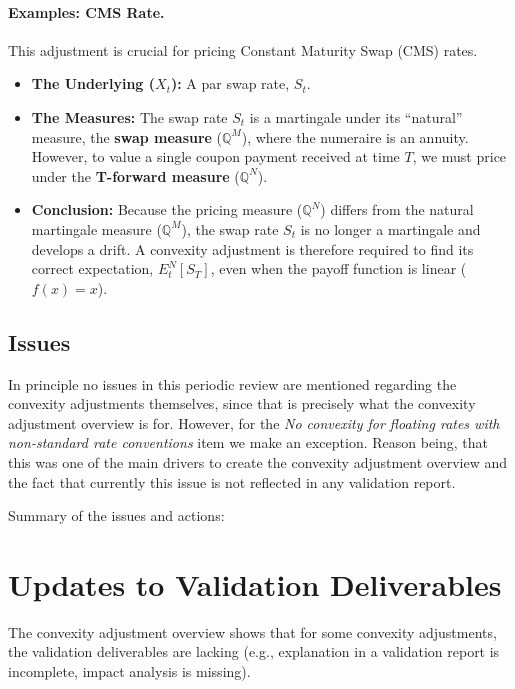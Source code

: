 \documentclass[reviewdoc]{pmv_report} %
\begin{document}
\paragraph*{Examples: CMS Rate.}
This adjustment is crucial for pricing Constant Maturity Swap (CMS) rates.
\begin{itemize}
    \item \textbf{The Underlying ($X_t$):} A par swap rate, $S_t$.
    \item \textbf{The Measures:} The swap rate $S_t$ is a martingale under its ``natural'' measure, the \textbf{swap measure} ($\mathbb{Q}^M$), where the numeraire is an annuity. However, to value a single coupon payment received at time $T$, we must price under the \textbf{T-forward measure} ($\mathbb{Q}^N$).
    \item \textbf{Conclusion:} Because the pricing measure ($\mathbb{Q}^N$) differs from the natural martingale measure ($\mathbb{Q}^M$), the swap rate $S_t$ is no longer a martingale and develops a drift. A convexity adjustment is therefore required to find its correct expectation, $E^N_t[S_T]$, even when the payoff function is linear ($f(x)=x$).
\end{itemize}

\subsection{Issues}
In principle no issues in this periodic review are mentioned regarding the convexity adjustments themselves, since that is precisely what the convexity adjustment overview is for.
However, for the \textit{No convexity for floating rates with non-standard rate conventions} item we make an exception.
Reason being, that this was one of the main drivers to create the convexity adjustment overview and the fact that currently this issue is not reflected in any validation report.

Summary of the issues and actions:
\begin{itemize}
  \issueactionII
\end{itemize}

\section{Updates to Validation Deliverables}
\label{sec:updateDeliverables}
The convexity adjustment overview shows that for some convexity adjustments, the validation deliverables are lacking (e.g., explanation in a validation report is incomplete, impact analysis is missing).
\end{document}
